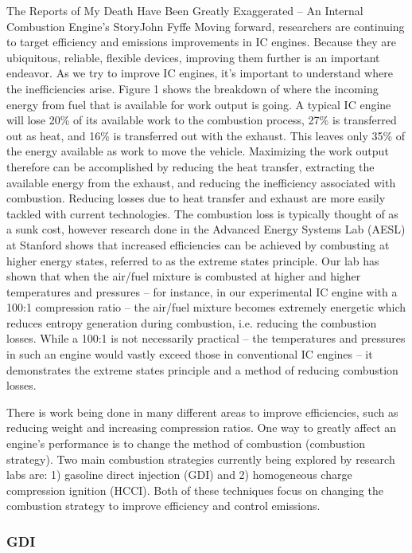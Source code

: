 \documentclass[10pt]{papertex}
\begin{document}
\begin{news}{2}{The Reports of My Death Have Been Greatly Exaggerated -- An Internal Combustion Engine’s Story}{John Fyffe}{}{}
Moving forward, researchers are continuing to target efficiency and emissions 
improvements in IC engines.  Because they are ubiquitous, reliable, flexible 
devices, improving them further is an important endeavor.  As we try to 
improve IC engines, it’s important to understand where the inefficiencies 
arise.  Figure 1 shows the breakdown of where the incoming energy from fuel 
that is available for work output is going. A typical IC engine will lose 
20\% of its available work to the combustion process, 27\% is transferred 
out as heat, and 16\% is transferred out with the exhaust. This leaves only 
35\% of the energy available as work to move the vehicle.  Maximizing the work 
output therefore can be accomplished by reducing the heat transfer, 
extracting the available energy from the exhaust, and reducing the 
inefficiency associated with combustion.  Reducing losses due to heat transfer 
and exhaust are more easily tackled with current technologies.  The 
combustion loss is typically thought of as a sunk cost, however research 
done in the Advanced Energy Systems Lab (AESL) at Stanford shows that 
increased efficiencies can be achieved by combusting at higher energy states, 
referred to as the extreme states principle.  Our lab has shown that when the 
air/fuel mixture is combusted at higher and higher temperatures and 
pressures – for instance, in our experimental IC engine with a 100:1 
compression ratio – the air/fuel mixture becomes extremely energetic which 
reduces entropy generation during combustion, i.e. reducing the combustion 
losses.  While a 100:1 is not necessarily practical – the temperatures and 
pressures in such an engine would vastly exceed those in conventional IC 
engines – it demonstrates the extreme states principle and a method of 
reducing combustion losses.


There is work being done in many different areas to improve efficiencies, 
such as reducing weight and increasing compression ratios. One way to greatly 
affect an engine’s performance is to change the method of combustion 
(combustion strategy).  Two main combustion strategies currently being 
explored by research labs are: 1) gasoline direct injection (GDI) and 2) 
homogeneous charge compression ignition (HCCI).  Both of these techniques 
focus on changing the combustion strategy to improve efficiency and control 
emissions.

\subsubsection*{GDI}


\end{news}
\end{document}
